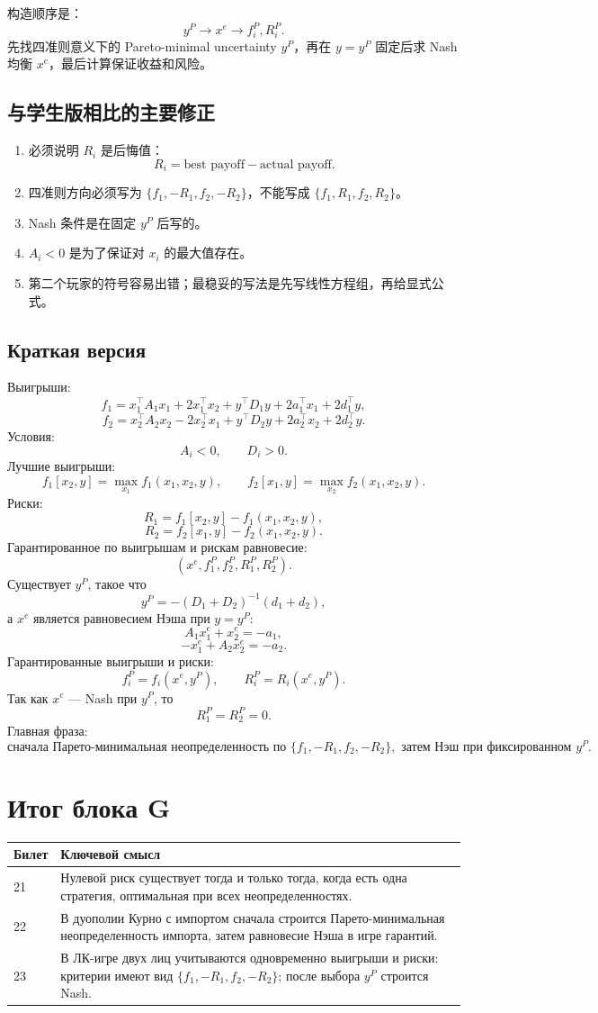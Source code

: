 \documentclass[12pt,a4paper]{article}
\begin{document}
构造顺序是：
\[
y^P\rightarrow x^e\rightarrow f_i^P,R_i^P.
\]
先找四准则意义下的 Pareto-minimal uncertainty $y^P$，再在 $y=y^P$ 固定后求 Nash 均衡 $x^e$，最后计算保证收益和风险。

\subsection{与学生版相比的主要修正}
\begin{enumerate}
  \item 必须说明 $R_i$ 是后悔值：
  \[
  R_i=\text{best payoff}-\text{actual payoff}.
  \]
  \item 四准则方向必须写为 $\{f_1,-R_1,f_2,-R_2\}$，不能写成 $\{f_1,R_1,f_2,R_2\}$。
  \item Nash 条件是在固定 $y^P$ 后写的。
  \item $A_i<0$ 是为了保证对 $x_i$ 的最大值存在。
  \item 第二个玩家的符号容易出错；最稳妥的写法是先写线性方程组，再给显式公式。
\end{enumerate}

\subsection{Краткая версия}
Выигрыши:
\[
f_1=x_1^\top A_1x_1+2x_1^\top x_2+y^\top D_1y+2a_1^\top x_1+2d_1^\top y,
\]
\[
f_2=x_2^\top A_2x_2-2x_2^\top x_1+y^\top D_2y+2a_2^\top x_2+2d_2^\top y.
\]
Условия:
\[
A_i<0,
\qquad D_i>0.
\]
Лучшие выигрыши:
\[
f_1[x_2,y]=\max_{x_1}f_1(x_1,x_2,y),
\qquad
f_2[x_1,y]=\max_{x_2}f_2(x_1,x_2,y).
\]
Риски:
\[
R_1=f_1[x_2,y]-f_1(x_1,x_2,y),
\]
\[
R_2=f_2[x_1,y]-f_2(x_1,x_2,y).
\]
Гарантированное по выигрышам и рискам равновесие:
\[
(x^e,f_1^P,f_2^P,R_1^P,R_2^P).
\]
Существует $y^P$, такое что
\[
y^P=-(D_1+D_2)^{-1}(d_1+d_2),
\]
а $x^e$ является равновесием Нэша при $y=y^P$:
\[
A_1x_1^e+x_2^e=-a_1,
\]
\[
-x_1^e+A_2x_2^e=-a_2.
\]
Гарантированные выигрыши и риски:
\[
f_i^P=f_i(x^e,y^P),
\qquad
R_i^P=R_i(x^e,y^P).
\]
Так как $x^e$ --- Nash при $y^P$, то
\[
R_1^P=R_2^P=0.
\]
Главная фраза:
\[
\text{сначала Парето-минимальная неопределенность по }\{f_1,-R_1,f_2,-R_2\},
\text{ затем Нэш при фиксированном }y^P.
\]

\newpage
\section*{Итог блока G}
\begin{tabular}{p{}p{}}
\toprule
Билет & Ключевой смысл \\
\midrule
21 & Нулевой риск существует тогда и только тогда, когда есть одна стратегия, оптимальная при всех неопределенностях. \\
22 & В дуополии Курно с импортом сначала строится Парето-минимальная неопределенность импорта, затем равновесие Нэша в игре гарантий. \\
23 & В ЛК-игре двух лиц учитываются одновременно выигрыши и риски: критерии имеют вид $\{f_1,-R_1,f_2,-R_2\}$; после выбора $y^P$ строится Nash. \\
\bottomrule
\end{tabular}
\end{document}
